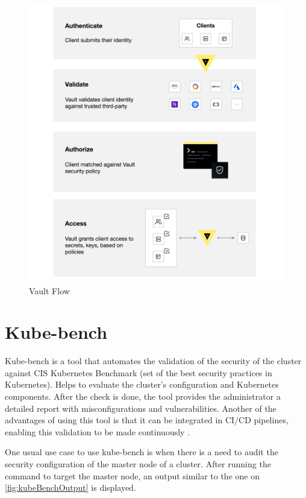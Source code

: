 \documentclass[a4paper,11pt,openright,BCOR=15mm]{scrbook}
\begin{document}
\begin{figure}[h!]
	\centering
	\label{fig:vaultFlow}
	\includegraphics[scale=0.2]{figs/vault-flow.png}
	\caption{Vault Flow \cite{vault_doc_introduction_nodate}}
\end{figure}

\section{Kube-bench}\label{sect:complementMonitor}

Kube-bench is a tool that automates the validation of the security of the cluster against CIS Kubernetes Benchmark (set of the best security practices in Kubernetes). Helps to evaluate the cluster’s configuration and Kubernetes components. After the check is done, the tool provides the administrator a detailed report with misconfigurations and vulnerabilities. Another of the advantages of using this tool is that it can be integrated in CI/CD pipelines, enabling this validation to be made continuously \cite{benhassan_depth_2024} \cite{noauthor_aquasecurity_kube_bench_2024}.

One usual use case to use kube-bench is when there is a need to audit the security configuration of the master node of a cluster. After running the command to target the master node, an output similar to the one on \ref{fig:kubeBenchOutput} is displayed.
\end{document}
